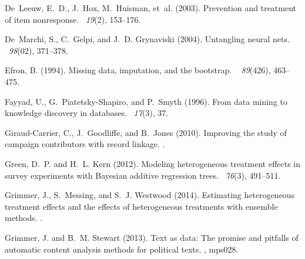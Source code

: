 \documentclass[10pt]{book}
\theoremstyle{definition}
\begin{document}
\begin{thebibliography}{11}
De~Leeuw, E.~D., J.~Hox, M.~Huisman, et~al. (2003).
\newblock Prevention and treatment of item nonresponse.
~{\em 19\/}(2), 153--176.

De~Marchi, S., C.~Gelpi, and J.~D. Grynaviski (2004).
\newblock Untangling neural nets.
~{\em 98\/}(02), 371--378.

\markboth{\hfill{\footnotesize\rm } \hfill}
{\hfill {\footnotesize\rm } \hfill}

Efron, B. (1994).
\newblock Missing data, imputation, and the bootstrap.
~{\em
  89\/}(426), 463--475.

Fayyad, U., G.~Piatetsky-Shapiro, and P.~Smyth (1996).
\newblock From data mining to knowledge discovery in databases.
~{\em 17\/}(3), 37.

Giraud-Carrier, C., J.~Goodliffe, and B.~Jones (2010).
\newblock Improving the study of campaign contributors with record linkage.
.

Green, D.~P. and H.~L. Kern (2012).
\newblock Modeling heterogeneous treatment effects in survey experiments with
  {B}ayesian additive regression trees.
~{\em 76\/}(3), 491--511.

Grimmer, J., S.~Messing, and S.~J. Westwood (2014).
\newblock Estimating heterogeneous treatment effects and the effects of
  heterogeneous treatments with ensemble methods.
.

Grimmer, J. and B.~M. Stewart (2013).
\newblock Text as data: The promise and pitfalls of automatic content analysis
  methods for political texts.
, mps028.


\end{thebibliography}
\end{document}
